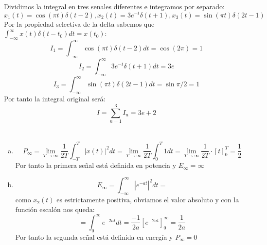 \documentclass[12pt,a4paper,oneside,onecolumn]{article}
\begin{document}
 
    \section{}
    Dividimos la integral en tres senales diferentes e integramos por separado:
    \[
    x_1(t) = \cos{(\pi t)}\delta{(t-2)}, x_2(t) = 3e^{-t}\delta{(t + 1)}, x_3(t) = \sin{(\pi t)} \delta{(2t - 1)}
    \]
    Por la propiedad selectiva de la delta sabemos que $\int_{-\infty}^{\infty}{x(t)\delta{(t-t_0)}dt = x(t_0)}$:
    \[
    I_1 = \int_{-\infty}^{\infty}{\cos{(\pi t)}\delta{(t-2)}}dt = \cos{(2\pi)} = 1
    \]
    \[
    I_2 = \int_{-\infty}^{\infty}{3e^{-t}\delta{(t + 1)}}dt = 3e
    \]
    \[
    I_3 = \int_{-\infty}^{\infty}{\sin{(\pi t)} \delta{(2t - 1)}}dt = \sin{\pi / 2} = 1
    \]
    Por tanto la integral original ser\'a:
    \[
    I = \sum_{n=1}^{3}{I_n} = 3e + 2
    \]
    
    \section{}
     \begin{enumerate}[a)]
     \item \[
        P_\infty = \lim_{T \to \infty}{\frac{1}{2T} \int_{-T}^{T}{|x(t)|^2}dt} = \lim_{T \to \infty}{\frac{1}{2T} \int_{0}^{T}{1}dt} =
        \lim_{T \to \infty}{\frac{1}{2T}}\cdot[t]^T_0 = \frac{1}{2}
     \]
     Por tanto la primera se\~nal est\'a definida en potencia y $E_\infty = \infty$
     \item \[
        E_\infty = \int_{-\infty}^{\infty}{|e^{-at}|^2}dt =
     \]
     como $x_2(t)$ es estrictamente positiva, obviamos el valor absoluto y con la funci\'on escal\'on nos queda:
     \[
     = \int_{0}^{\infty}{e^{-2at}}dt = \frac{-1}{2a}[e^{-2at}]^\infty_0 = \frac{1}{2a}
     \]
     Por tanto la segunda se\~nal est\'a definida en energ\'ia y $P_\infty = 0$
    \end{enumerate}
    
    
\end{document}
